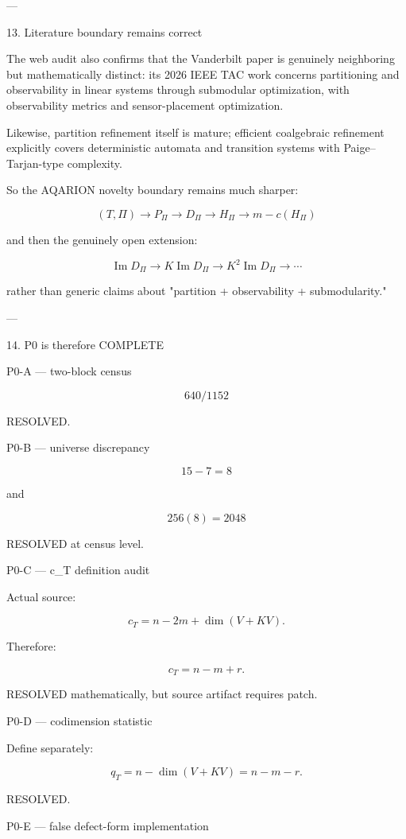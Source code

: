 ---

13. Literature boundary remains correct

The web audit also confirms that the Vanderbilt paper is genuinely neighboring but mathematically distinct: its 2026 IEEE TAC work concerns partitioning and observability in linear systems through submodular optimization, with observability metrics and sensor-placement optimization. 

Likewise, partition refinement itself is mature; efficient coalgebraic refinement explicitly covers deterministic automata and transition systems with Paige–Tarjan-type complexity. 

So the AQARION novelty boundary remains much sharper:

\[
\boxed{
(T,\Pi)
\rightarrow
P_\Pi
\rightarrow
D_\Pi
\rightarrow
H_\Pi
\rightarrow
m-c(H_\Pi)
}
\]

and then the genuinely open extension:

\[
\boxed{
\operatorname{Im}D_\Pi
\rightarrow
K\operatorname{Im}D_\Pi
\rightarrow
K^2\operatorname{Im}D_\Pi
\rightarrow\cdots
}
\]

rather than generic claims about "partition + observability + submodularity."


---

14. P0 is therefore COMPLETE

P0-A — two-block census

\[
\boxed{640/1152}
\]

RESOLVED.

P0-B — universe discrepancy

\[
\boxed{15-7=8}
\]

and

\[
\boxed{256(8)=2048}
\]

RESOLVED at census level.

P0-C — c_T definition audit

Actual source:

\[
c_T=n-2m+\dim(V+KV).
\]

Therefore:

\[
\boxed{c_T=n-m+r.}
\]

RESOLVED mathematically, but source artifact requires patch.

P0-D — codimension statistic

Define separately:

\[
\boxed{q_T=n-\dim(V+KV)=n-m-r.}
\]

RESOLVED.

P0-E — false defect-form implementation

